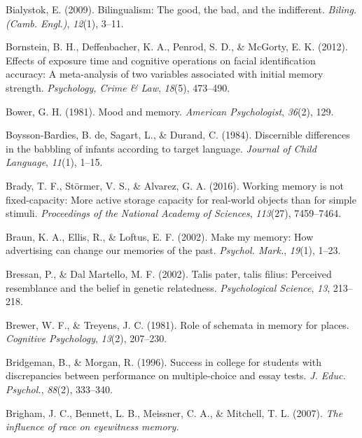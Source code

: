 \documentclass[
]{krantz}
\newlength{\cslhangindent}
\newenvironment{CSLReferences}[2] %
 {\begin{list}{}{%
  \setlength{\itemindent}{0pt}
  \setlength{\leftmargin}{0pt}
  \setlength{\parsep}{0pt}
  \ifodd #1
   \setlength{\leftmargin}{\cslhangindent}
   \setlength{\itemindent}{-1\cslhangindent}
  \fi
  \setlength{\itemsep}{#2\baselineskip}}}
 {\end{list}}
\begin{document}
\begin{CSLReferences}{1}{0}
Bialystok, E. (2009). Bilingualism: The good, the bad, and the indifferent. \emph{Biling. (Camb. Engl.)}, \emph{12}(1), 3--11.

Bornstein, B. H., Deffenbacher, K. A., Penrod, S. D., \& McGorty, E. K. (2012). Effects of exposure time and cognitive operations on facial identification accuracy: A meta-analysis of two variables associated with initial memory strength. \emph{Psychology, Crime \& Law}, \emph{18}(5), 473--490.

Bower, G. H. (1981). Mood and memory. \emph{American Psychologist}, \emph{36}(2), 129.

Boysson-Bardies, B. de, Sagart, L., \& Durand, C. (1984). Discernible differences in the babbling of infants according to target language. \emph{Journal of Child Language}, \emph{11}(1), 1--15.

Brady, T. F., Störmer, V. S., \& Alvarez, G. A. (2016). Working memory is not fixed-capacity: More active storage capacity for real-world objects than for simple stimuli. \emph{Proceedings of the National Academy of Sciences}, \emph{113}(27), 7459--7464.

Braun, K. A., Ellis, R., \& Loftus, E. F. (2002). Make my memory: How advertising can change our memories of the past. \emph{Psychol. Mark.}, \emph{19}(1), 1--23.

Bressan, P., \& Dal Martello, M. F. (2002). Talis pater, talis filius: Perceived resemblance and the belief in genetic relatedness. \emph{Psychological Science}, \emph{13}, 213--218.

Brewer, W. F., \& Treyens, J. C. (1981). Role of schemata in memory for places. \emph{Cognitive Psychology}, \emph{13}(2), 207--230.

Bridgeman, B., \& Morgan, R. (1996). Success in college for students with discrepancies between performance on multiple-choice and essay tests. \emph{J. Educ. Psychol.}, \emph{88}(2), 333--340.

Brigham, J. C., Bennett, L. B., Meissner, C. A., \& Mitchell, T. L. (2007). \emph{The influence of race on eyewitness memory.}


\end{CSLReferences}
\end{document}
